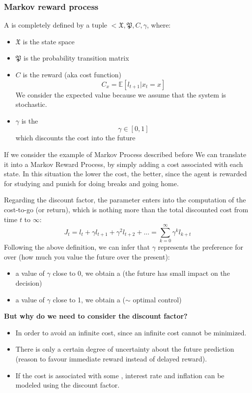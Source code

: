 \subsubsection{Markov reward process}
A  is completely defined by a tuple $<\mathfrak{X}, \mathfrak{P}, C, \gamma$, where:
\begin{itemize}
\item $\mathfrak{X}$ is the state space
\item $\mathfrak{P}$ is the probability transition matrix
\item $C$ is the reward (aka cost function)
\[C_x = \mathbb{E}[l_{t+1}|x_t = x]\]
We consider the expected value because we assume that the system is stochastic.
\item $\gamma$ is the 
\[\gamma \in [0,1]\]
which discounts the cost into the future
\end{itemize}
If we consider the example of Markov Process described before
We can translate it into a Markov Reward Process, by simply adding a cost associated with each state. In this situation the lower the cost, the better, since the agent is rewarded for studying and punish for doing breaks and going home.

Regarding the discount factor, the parameter enters into the computation of the cost-to-go (or return), which is nothing more than the total discounted cost from time $t$ to $\infty$:
\[J_t = l_t + \gamma l_{t+1} + \gamma^2 l_{t+2} + ... = \sum_{k=0}^{\infty} \gamma^{k}l_{k+t}\]
Following the above definition, we can infer that $\gamma$ represents the preference for  over  (how much you value the future over the present):
\begin{itemize}
\item a value of $\gamma$ close to 0, we obtain a  (the future has small impact on the decision)
\item a value of $\gamma$ close to 1, we obtain a  ($\sim$ optimal control)
\end{itemize}

\begin{center}
\textbf{But why do we need to consider the discount factor?}
\end{center}
\begin{itemize}
\item In order to avoid an infinite cost, since an infinite cost cannot be minimized.
\item There is only a certain degree of uncertainty about the future prediction (reason to favour immediate reward instead of delayed reward).
\item If the cost is associated with some , interest rate and inflation can be modeled using the discount factor. 
\end{itemize}

